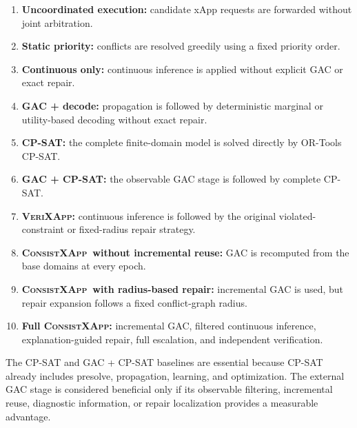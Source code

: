 \documentclass[pdflatex,sn-mathphys-num,iicol,oneside]{sn-jnl}
\newcommand{\method}{\textsc{ConsistXApp}}
\newcommand{\legacy}{\textsc{VeriXApp}}
\begin{document}
\begin{enumerate}

    \item \textbf{Uncoordinated execution:}
    candidate xApp requests are forwarded without joint arbitration.

    \item \textbf{Static priority:}
    conflicts are resolved greedily using a fixed priority order.

    \item \textbf{Continuous only:}
    continuous inference is applied without explicit GAC or exact
    repair.

    \item \textbf{GAC + decode:}
    propagation is followed by deterministic marginal or
    utility-based decoding without exact repair.

    \item \textbf{CP-SAT:}
    the complete finite-domain model is solved directly by OR-Tools
    CP-SAT.

    \item \textbf{GAC + CP-SAT:}
    the observable GAC stage is followed by complete CP-SAT.

    \item \textbf{\legacy:}
    continuous inference is followed by the original
    violated-constraint or fixed-radius repair strategy.

    \item \textbf{\method\ without incremental reuse:}
    GAC is recomputed from the base domains at every epoch.

    \item \textbf{\method\ with radius-based repair:}
    incremental GAC is used, but repair expansion follows a fixed
    conflict-graph radius.

    \item \textbf{Full \method:}
    incremental GAC, filtered continuous inference,
    explanation-guided repair, full escalation, and independent
    verification.

\end{enumerate}

The CP-SAT and GAC + CP-SAT baselines are essential because CP-SAT
already includes presolve, propagation, learning, and optimization.
The external GAC stage is considered beneficial only if its observable
filtering, incremental reuse, diagnostic information, or repair
localization provides a measurable advantage.

\end{document}
